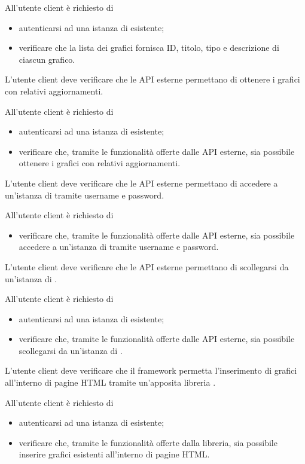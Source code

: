 		All'utente client è richiesto di
		\begin{itemize}
			\item autenticarsi ad una istanza di \projectname{} esistente;
			\item verificare che la lista dei grafici fornisca ID, titolo, tipo e descrizione di ciascun grafico.
		\end{itemize}

	L'utente client deve verificare che le API esterne permettano di ottenere i grafici con relativi aggiornamenti.
		
		All'utente client è richiesto di
		\begin{itemize}
			\item autenticarsi ad una istanza di \projectname{} esistente;
			\item verificare che, tramite le funzionalità offerte dalle API esterne, sia possibile ottenere i grafici con relativi aggiornamenti.
		\end{itemize}

	L'utente client deve verificare che le API esterne permettano di accedere a un'istanza di \projectname{} tramite username e password.
		
		All'utente client è richiesto di
		\begin{itemize}
			\item verificare che, tramite le funzionalità offerte dalle API esterne, sia possibile accedere a un'istanza di \projectname{} tramite username e password.
		\end{itemize}

	 L'utente client deve verificare che le API esterne permettano di scollegarsi  da un'istanza di \projectname{}.
		
		All'utente client è richiesto di
		\begin{itemize}
			\item autenticarsi ad una istanza di \projectname{} esistente;
			\item verificare che, tramite le funzionalità offerte dalle API esterne, sia possibile scollegarsi da un'istanza di \projectname{}.
		\end{itemize}

	L'utente client deve verificare che il framework permetta l'inserimento di grafici all'interno di pagine HTML tramite un'apposita libreria .
		
		All'utente client è richiesto di
		\begin{itemize}
			\item autenticarsi ad una istanza di \projectname{} esistente;
			\item verificare che, tramite le funzionalità offerte dalla libreria, sia possibile inserire grafici esistenti all'interno di pagine HTML.
		\end{itemize}

